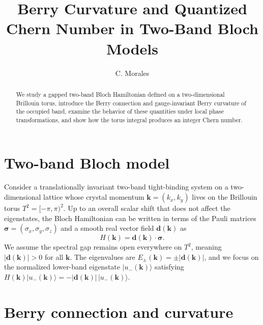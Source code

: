 \documentclass{article}
\title{Berry Curvature and Quantized Chern Number in Two-Band Bloch Models}
\author{C. Morales}
\date{}
\begin{document}
\maketitle

\begin{abstract}
We study a gapped two-band Bloch Hamiltonian defined on a two-dimensional
Brillouin torus, introduce the Berry connection and gauge-invariant Berry
curvature of the occupied band, examine the behavior of these quantities under
local phase transformations, and show how the torus integral produces an integer
Chern number.
\end{abstract}

\section{Two-band Bloch model}\label{sec:bloch}

Consider a translationally invariant two-band tight-binding system on a
two-dimensional lattice whose crystal momentum $\mathbf{k} = (k_x, k_y)$ lives on
the Brillouin torus $T^2 = [-\pi, \pi)^2$. Up to an overall scalar shift that does
not affect the eigenstates, the Bloch Hamiltonian can be written in terms of the
Pauli matrices $\boldsymbol{\sigma} = (\sigma_x, \sigma_y, \sigma_z)$ and a smooth
real vector field $\mathbf{d}(\mathbf{k})$ as
\begin{equation}\label{eq:bloch-h}
  H(\mathbf{k}) = \mathbf{d}(\mathbf{k}) \cdot \boldsymbol{\sigma}.
\end{equation}
We assume the spectral gap remains open everywhere on $T^2$, meaning
$|\mathbf{d}(\mathbf{k})| > 0$ for all $\mathbf{k}$. The eigenvalues are
$E_{\pm}(\mathbf{k}) = \pm |\mathbf{d}(\mathbf{k})|$, and we focus on the
normalized lower-band eigenstate $|u_{-}(\mathbf{k})\rangle$ satisfying
$H(\mathbf{k}) |u_{-}(\mathbf{k})\rangle = -|\mathbf{d}(\mathbf{k})|\,|u_{-}(\mathbf{k})\rangle$.

\section{Berry connection and curvature}\label{sec:connection}
\end{document}
